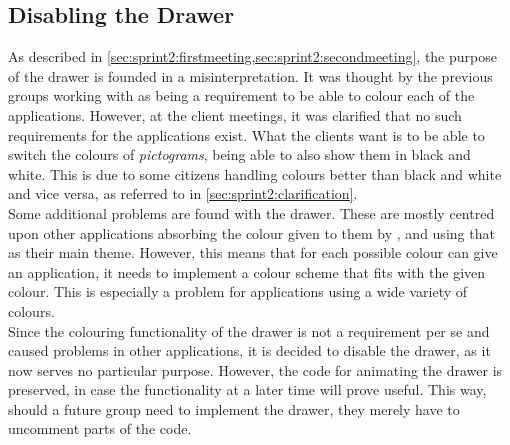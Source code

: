 \subsection{Disabling the Drawer}
As described in \cref{sec:sprint2:firstmeeting,sec:sprint2:secondmeeting}, the purpose of the drawer is founded in a misinterpretation.
It was thought by the previous groups working with \launcher as being a requirement to be able to colour each of the \giraf applications.
However, at the client meetings, it was clarified that no such requirements for the applications exist.
What the clients want is to be able to switch the colours of \textit{pictograms}, being able to also show them in black and white.
This is due to some citizens handling colours better than black and white and vice versa, as referred to in \cref{sec:sprint2:clarification}.\\

Some additional problems are found with the drawer.
These are mostly centred upon other applications absorbing the colour given to them by \launcher, and using that as their main theme.
However, this means that for each possible colour \launcher can give an application, it needs to implement a colour scheme that fits with the given colour.
This is especially a problem for applications using a wide variety of colours.\\

Since the colouring functionality of the drawer is not a requirement per se and caused problems in other applications, it is decided to disable the drawer, as it now serves no particular purpose.
However, the code for animating the drawer is preserved, in case the functionality at a later time will prove useful.
This way, should a future group need to implement the drawer, they merely have to uncomment parts of the code.